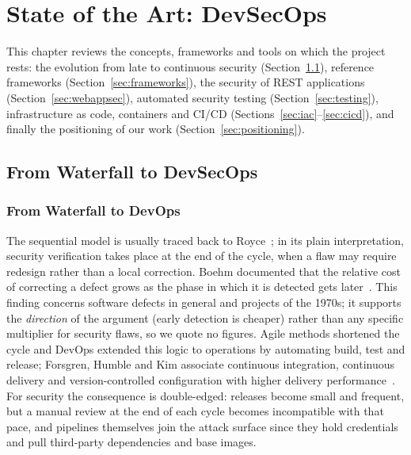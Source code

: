 
\chapter{State of the Art: DevSecOps}\label{chap:sota}

This chapter reviews the concepts, frameworks and tools on which the project rests: the evolution from late to continuous security (Section~\ref{sec:evolution}), reference frameworks (Section~\ref{sec:frameworks}), the security of REST applications (Section~\ref{sec:webappsec}), automated security testing (Section~\ref{sec:testing}), infrastructure as code, containers and CI/CD (Sections~\ref{sec:iac}--\ref{sec:cicd}), and finally the positioning of our work (Section~\ref{sec:positioning}).

\section{From Waterfall to DevSecOps}
\label{sec:evolution}

\subsection{From Waterfall to DevOps}

The sequential model is usually traced back to Royce~\cite{royce1970}; in its plain interpretation, security verification takes place at the end of the cycle, when a flaw may require redesign rather than a local correction. Boehm documented that the relative cost of correcting a defect grows as the phase in which it is detected gets later~\cite{boehm1981}. This finding concerns software defects in general and projects of the 1970s; it supports the \emph{direction} of the argument (early detection is cheaper) rather than any specific multiplier for security flaws, so we quote no figures. Agile methods shortened the cycle and DevOps extended this logic to operations by automating build, test and release; Forsgren, Humble and Kim associate continuous integration, continuous delivery and version-controlled configuration with higher delivery performance~\cite{forsgren2018}. For security the consequence is double-edged: releases become small and frequent, but a manual review at the end of each cycle becomes incompatible with that pace, and pipelines themselves join the attack surface since they hold credentials and pull third-party dependencies and base images.

